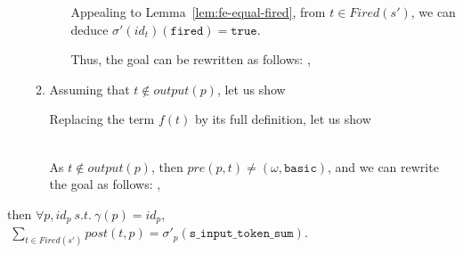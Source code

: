 \documentclass[dvipsnames,12pt]{article}
\begin{document}
\begin{niproof}
\begin{itemize}
\begin{enumerate}
\begin{itemize}
      Appealing to Lemma~\ref{lem:fe-equal-fired}, from
      $t\in{}Fired(s')$, we can deduce
      $\sigma'(id_t)(\texttt{fired})=\mathtt{true}$.

      Thus, the goal can be rewritten as follows:
      \fbox{$\omega=\omega$}, 
      
    \end{itemize}

  \item Assuming that $t\notin{}output(p)$, let us show

    Replacing the term $f(t)$ by its full definition, let us show

    \\

    As $t\notin{}output(p)$, then
    $pre(p,t)\neq(\omega,\mathtt{basic})$, and we can rewrite the goal
    as follows: ,     
  \end{enumerate}
   
 \end{itemize}
 
\end{niproof}


\begin{lemma}
  \label{lem:fe-equal-its}
  \fehyps{} then $\forall{}p,id_p~s.t.~\gamma(p)=id_p$,
  $~\sum\limits_{t\in{}Fired(s')}post(t,p)=\sigma'_p(\texttt{s\_input\_token\_sum})$.
\end{lemma}
\end{document}
